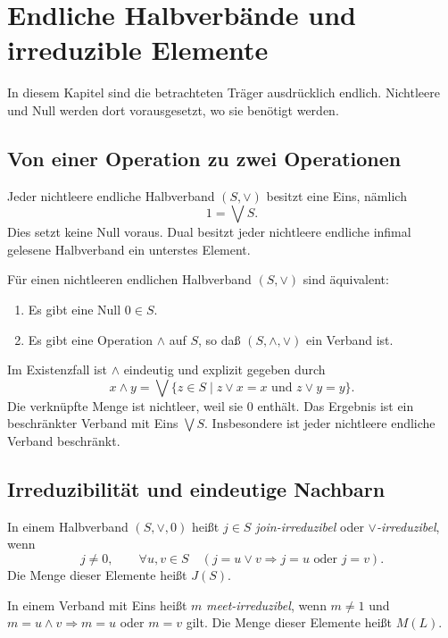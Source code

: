 \chapter{Endliche Halbverbände und irreduzible Elemente}
\label{b45guide:ch:finite}

In diesem Kapitel sind die betrachteten Träger ausdrücklich endlich.
Nichtleere und Null werden dort vorausgesetzt, wo sie benötigt werden.

\section{Von einer Operation zu zwei Operationen}

\begin{theorem}
\label{b45guide:thm:finite-top}
Jeder nichtleere endliche Halbverband $(S,\vee)$ besitzt eine Eins,
nämlich
\[
 1=\bigvee S.
\]
Dies setzt keine Null voraus. Dual besitzt jeder nichtleere
endliche infimal gelesene Halbverband ein unterstes Element.
\cite{project}
\end{theorem}

\begin{theorem}
\label{b45guide:thm:finite-extension}
Für einen nichtleeren endlichen Halbverband $(S,\vee)$
sind äquivalent:
\begin{enumerate}
\item Es gibt eine Null $0\in S$.
\item Es gibt eine Operation $\wedge$ auf $S$, so daß
$(S,\wedge,\vee)$ ein Verband ist.
\end{enumerate}
Im Existenzfall ist $\wedge$ eindeutig und explizit gegeben durch
\[
 x\wedge y=
 \bigvee\{z\in S\mid z\vee x=x\text{ und }z\vee y=y\}.
\]
Die verknüpfte Menge ist nichtleer, weil sie $0$ enthält.
Das Ergebnis ist ein beschränkter Verband mit Eins $\bigvee S$.
Insbesondere ist jeder nichtleere endliche Verband beschränkt.
\cite{project}
\end{theorem}

\section{Irreduzibilität und eindeutige Nachbarn}

\begin{definition}
\label{b45guide:def:irreducible}
In einem Halbverband $(S,\vee,0)$ heißt $j\in S$
\emph{join-irreduzibel} oder \emph{$\vee$-irreduzibel}, wenn
\[
 j\ne0,\qquad
 \forall u,v\in S\quad
 (j=u\vee v\Rightarrow j=u\text{ oder }j=v).
\]
Die Menge dieser Elemente heißt $J(S)$.

In einem Verband mit Eins heißt $m$ \emph{meet-irreduzibel},
wenn $m\ne1$ und
$m=u\wedge v\Rightarrow m=u$ oder $m=v$ gilt.
Die Menge dieser Elemente heißt $M(L)$.
\end{definition}

